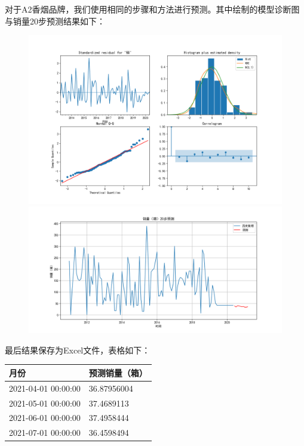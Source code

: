\documentclass[a4paper]{article}
\begin{document}
	对于A2香烟品牌，我们使用相同的步骤和方法进行预测。其中绘制的模型诊断图与销量20步预测结果如下：

	\begin{figure}[H]
		\centering
		\includegraphics[width=1.0\textwidth]{img/A2_1.png}
		\includegraphics[width=1.0\textwidth]{img/A2_2.png}
	\end{figure}
	最后结果保存为Excel文件，表格如下：

	\setlength{\extrarowheight}{4pt}
	\begin{table}[H]
		\centering
		\begin{tabularx}{\textwidth}{|X|X|} %
			\hline
			月份 & 预测销量（箱）\\
			\hline
			2021-04-01 00:00:00 & 36.87956004\\
			\hline
			2021-05-01 00:00:00 & 37.4689113\\
			\hline
			2021-06-01 00:00:00 & 37.4958444\\
			\hline
			2021-07-01 00:00:00 & 36.4598494\\
			\hline
		\end{tabularx}
	\end{table}
\end{document}
